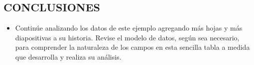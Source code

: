 \documentclass[12pt,letterpaper]{article}
\begin{document}
\begin{enumerate}
\section{CONCLUSIONES}
\begin{itemize}
    \item Continúe analizando los datos de este ejemplo agregando más hojas y más diapositivas a su historia. Revise el modelo de datos, según sea necesario, para comprender la naturaleza de los campos en esta sencilla tabla a medida que desarrolla y realiza su análisis.\\
\end{itemize}
\end{enumerate}

\end{document}
